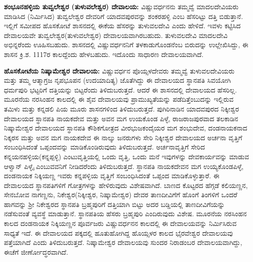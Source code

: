 \textbf{ಶಂಭೂನಹಳ್ಳಿಯ ತುವ್ವಲೇಶ್ವರ (ತುಳುವಲೇಶ್ವರ) ದೇವಾಲಯ:} ವಿಷ್ಣುವರ್ಧನನು ತಮ್ಮವ್ವೆ ಮಾದಲದೇವಿಯರು ಮಾಡಿಸಿದ (ನಿರ್ಮಿಸಿದ) ತುವ್ವಲೇಶ್ವರ ದೇವರಿಗೆ ಯಾದವಪುರವನ್ನು ಶಂಕರಹಳ್ಳಿ ಎಂಬ ಹೆಸರಿಟ್ಟು ದತ್ತಿ ಬಿಡುತ್ತಾನೆ. ಇಲ್ಲಿಗೆ ಸಮೀಪದ ಹೊಸಕೋಟೆ ಶಾಸನದಲ್ಲಿ ಈಕೆಯ ಹೆಸರನ್ನು ತುಳುವಲದೇವಿ ಎಂದು ಹೇಳಿದೆ. ಇವಳು ಕಟ್ಟಿಸಿದ ದೇವಾಲಯವೇ ತುವ್ವಲೇಶ್ವರ(ತುಳುವಲೇಶ್ವರ) ದೇವಾಲಯವಾಗಿರಬಹುದು. ತುಳುವಲದೇವಿ ಮಾದಲದೇವಿ ಅಭಿನ್ನರೆಂದು ಊಹಿಸಬಹುದು. ಶಾಸನದಲ್ಲಿ ವಿಷ್ಣುವರ್ಧನನಿಗೆ ತಳಕಾಡುಗೊಂಡನೆಂಬ ಬಿರುದನ್ನು ಉಲ್ಲೇಖಿಸಿದ್ದು, ಈ ಶಾಸನ ಕ್ರಿ.ಶ. 1117ರ ಕಾಲದ್ದೆಂದು ಹೇಳಬಹುದು. ಇದೊಂದು ಸಾಧಾರಣ ದೇವಾಲಯವಾಗಿದೆ.

\textbf{ಹೊಸಕೋಟೆಯ ನಿಷ್ಕಾಮೇಶ್ವರ ದೇವಾಲಯ:} ವಿಷ್ಣುವರ್ಧನ ಪೊಯ್ಸಳದೇವರು ತಮ್ಮವ್ವೆ ತುಳುವಲದೇವಿಯರು ಮತ್ತು ತಮ್ಮ ಆತ್ಮಾಗ್ರಜ ನೃಪಭೂಪನ (ಉದಯಾದಿತ್ಯ) ಜೊತೆಗಿದ್ದು ಈ ದೇವಾಲಯದ ಸ್ಥಾನಪತಿ ಸಿವಯೋಗಿ ಧರ್ಮಪುರಿ ಭಟ್ಟರಿಗೆ ದತ್ತಿಯನ್ನು ಬಿಟ್ಟರೆಂದು ತಿಳಿದುಬರುತ್ತದೆ. ಆದರೆ ಈ ಶಾಸನದಲ್ಲಿ ದೇವಾಲಯದ ಹೆಸರಿಲ್ಲ. ಮೂರನೆಯ ನರಸಿಂಹನ ಕಾಲದಲ್ಲಿ ಈ ಶೈವ ದೇವಾಲಯವು ಪ್ರಾಮುಖ್ಯತೆಯನ್ನು ಪಡೆದಿತ್ತೆಂಬುದನ್ನು ಇಲ್ಲಿರುವ ತಮಿಳು ಮತ್ತು ಕನ್ನಡಲಿ ಪಿಯ ಮೂರು ಶಾಸನಗಳಿಂದ ತಿಳಿದುಬರುತ್ತದೆ. ಪುಗಿರಿನಾಡಿನ ಯಾದವಪುರದ ನಿಕ್ಕೀಶ್ವರ ದೇವಾಲಯದ ಸ್ಥಾನಪತಿ ನಾಯಕದೇವ ಮತ್ತು ಅವನ ಮಗ ಉಯಕೊಂಡ ಪಿಳ್ಳೆ, ರಾಜರಾಜಪುರವಾದ ತಲಕಾಡಿನ ನಿಷ್ಕಾಮೇಶ್ವರ ದೇವಾಲಯದ ಸ್ಥಾನಪತಿ ಕೌಶಿಕಗೋತ್ರದ ವೀರಭುಜಕಂದೈಯರ ಮಗ ಶಂಭುದೇವ, ದಂಡನಾಯಕನಾದ ನಿಕ್ಕರಸ ಮತ್ತು ಅವನ ಮಗ ನಾಯಕದೇವ ಈ ನಾಲ್ಕು ಜನರುಗಳು ಸೇರಿ ನಿಕ್ಕೀಶ್ವರ ದೇವಾಲಯದ ಅರ್ಚನಾ ವೃತ್ತಿಗೆ ಸಂಬಂಧಿಸಿದಂತೆ ಒಪ್ಪಂದವನ್ನು ಮಾಡಿಕೊಂಡಿರುವುದು ತಿಳಿದುಬರುತ್ತದೆ. ಅರ್ಚನಾವೃತ್ತಿಗೆ ಸೇರಿದ ಕನ್ನಯನಹಳ್ಳಿಯ(ಕನ್ನಪ್ಪಳ್ಳಿ) ಎಂಟುವೃತ್ತಿಯಲ್ಲಿ ಒಂದು ವೃತ್ತಿ, ಒಂದು ಮನೆ ಇವುಗಳನ್ನು ದೇವಕಾರ್ಯವನ್ನು ಮಾಡುವ ಆಳ್ವಾನ್​ ಪಿಳ್ಳೈ ಎಂಬುವವನಿಗೆ ನೀಡಿದರೆಂದು ತಿಳಿದುಬರುತ್ತದೆ. ಸ್ಥಾನಪತಿ ನಾಯಕದೇವನ ಮಗ ಉಯ್ಯಕೊಂಡಪಿಳ್ಳೆ, ದಂಡನಾಯಕ ನಿಕ್ಕಿಯಣ್ಣ ಇವರು ಕನ್ನಪಳ್ಳಿಯ ವೃತ್ತಿಗೆ ಸಂಬಂಧಿಸಿದಂತೆ ಒಪ್ಪಂದ ಮಾಡಿಕೊಳ್ಳುತ್ತಾರೆ. ಈ ದೇವಾಲಯದ ಸ್ಥಾನಪತಿಗಳಿಗೆ ಗೋತ್ರಗಳನ್ನು ಹೇಳಿರುವುದು ವಿಶೇಷವಾಗಿದೆ. ಬಾಣದ ಕೊಟ್ಟರದ ಹೆಗ್ಗಡೆ ಕಲಿಯಣ್ಣನ, ಸೇನಬೋವ ನಾಗಣ್ಣನು, ನಿಕೇಶ್ವರ(ನಿಕ್ಕೀಶ್ವರ, ನಿಷ್ಕಾಮೇಶ್ವರ) ದೇವರ ತಾಣದೀವಿಗೆಗೆ ಹೊಂಗೆ ತಿಂಗಳಿಗೆ ಒಂದರೆ ಹಾಗವನ್ನು ಶ‍್ರೀ ನಿಕೇಶ್ವರದ ಸ್ಥಾನಪತಿ ಬ್ರಹ್ಮಪುರಿಗೆ ದತ್ತಿಯಾಗಿ ಬಿಟ್ಟು ಅದರ ಬಡ್ಡಿಯಲ್ಲಿ ತಾಣದೀವಿಗೆಯನ್ನು ನಡೆಸುವಂತೆ ವ್ಯವಸ್ಥೆ ಮಾಡುತ್ತಾನೆ. ಸ್ಥಾನಪತಿಯ ಹೆಸರು ಬ್ರಹ್ಮಪುರಿ ಎಂದಿರುವುದು ವಿಶೇಷ. ಮೂರನೆಯ ನರಸಿಂಹನ ಕಾಲದ ದಂಡನಾಯಕ ನಿಕ್ಕಿಯಣ್ಣನ ಪೂರ್ವಜರು ವಿಷ್ಣುವರ್ಧನನ ಕಾಲದಲ್ಲಿ ಈ ದೇವಾಲಯವನ್ನು ನಿರ್ಮಿಸಿರುವ ಸಾಧ್ಯತೆ ಇದೆ. ಈ ದೇವಾಲಯದ ಪಕ್ಕದಲ್ಲಿ ಹೂತುಹೋಗಿದ್ದ ಹೊಯ್ಸಳರ ಕಾಲದ ಭೈರವೇಶ್ವರ ದೇವಾಲಯವು ಪತ್ತೆಯಾಗಿದೆ ಎಂದು ತಿಳಿದುಬರುತ್ತದೆ. ನಿಷ್ಕಾಮೇಶ್ವರ ದೇವಾಲಯವು ಸುಂದರ ನಿರಾಡಂಬರ ದೇವಾಲಯವಾಗಿದ್ದು, ಈಚೆಗೆ ಜೀರ್ಣೋದ್ಧರವಾಗಿದೆ.

